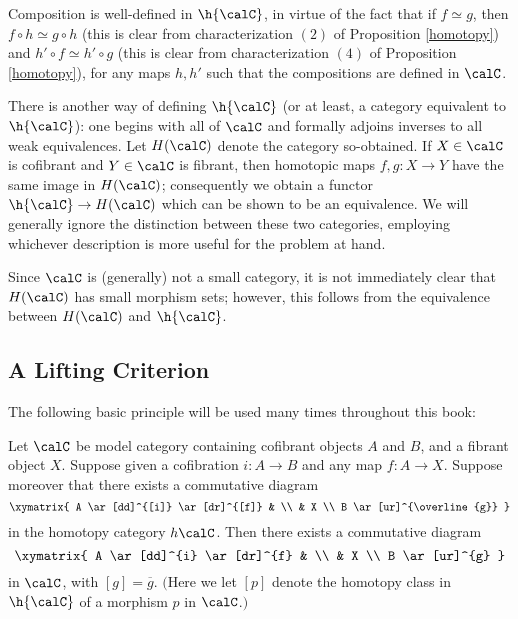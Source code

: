 Composition is well-defined in $\h{\calC}$, in virtue of the fact that if $f \simeq g$, then
$f \circ h \simeq g \circ h$ (this is clear from characterization $(2)$ of Proposition \ref{homotopy}) and $h' \circ f \simeq h' \circ g$ (this is clear from characterization $(4)$ of Proposition \ref{homotopy}), for any maps $h,h'$ such that the compositions are defined in $\calC$.

There is another way of defining $\h{\calC}$ (or at least, a category equivalent to $\h{\calC}$): one begins with all of $\calC$ and formally adjoins inverses to all weak equivalences. Let $H(\calC)$ denote the category so-obtained. If $X \in \calC$ is cofibrant and $Y \in \calC$ is fibrant, then homotopic maps $f,g: X \rightarrow Y$ have the same image in $H(\calC)$; consequently we obtain a functor $\h{\calC} \rightarrow H(\calC)$ which can be shown to be an equivalence. We will generally ignore the distinction between these two categories, employing whichever description is more useful for the problem at hand.

\begin{remark}
Since $\calC$ is (generally) not a small category, it is not immediately clear that $H(\calC)$ has small morphism sets; however, this follows from the equivalence between $H(\calC)$ and $\h{\calC}$.
\end{remark}

\subsection{A Lifting Criterion}

The following basic principle will be used many times throughout this book:

\begin{proposition}\label{princex}
Let $\calC$ be model category containing cofibrant objects $A$ and $B$, and a fibrant object $X$.
Suppose given a cofibration $i: A \rightarrow B$ and any map $f: A \rightarrow X$. Suppose
moreover that there exists a commutative diagram
$$ \xymatrix{ A \ar[dd]^{[i]} \ar[dr]^{[f]} & \\
& X \\
B \ar[ur]^{\overline{g}} } $$
in the homotopy category $h \calC$. Then there exists a commutative diagram
$$ \xymatrix{ A \ar[dd]^{i} \ar[dr]^{f} & \\
& X \\
B \ar[ur]^{g} } $$ in $\calC$, with $[g] = \overline{g}$. $($Here we let $[p]$ denote the homotopy class in $\h{ \calC}$ of a morphism $p$ in $\calC$.$)$ 
\end{proposition}

